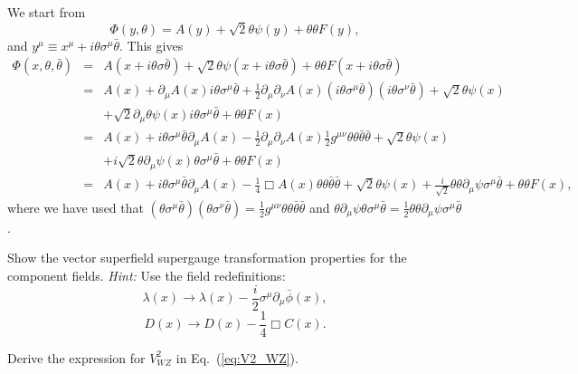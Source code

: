 \documentclass[notes.tex]{subfiles}
\begin{document}
\begin{Answer}
We start from
\begin{equation*}
\Phi(y, \theta) = A(y) + \sqrt{2}\theta\psi(y) + \theta\theta F(y),
\end{equation*}
and $y^\mu \equiv x^\mu + i\theta\sigma^\mu \bar{\theta}$. This gives
\begin{eqnarray*}
\Phi(x, \theta, \bar\theta) &=& A(x + i\theta\sigma\bar{\theta}) + \sqrt{2}\theta\psi(x + i\theta\sigma\bar{\theta}) + \theta\theta F(x + i\theta\sigma \bar{\theta}) \\
&=& A(x) + \partial_\mu A(x)i\theta\sigma^\mu \bar{\theta} + \frac{1}{2}\partial_\mu\partial_\nu A(x)(i\theta\sigma^\mu \bar{\theta})(i\theta\sigma^\nu \bar{\theta})+ \sqrt{2}\theta\psi(x) \\
&&+ \sqrt{2}\partial_\mu\theta\psi(x)i\theta\sigma^\mu \bar{\theta} + \theta\theta F(x) \\
&=& A(x) + i\theta\sigma^\mu \bar{\theta}\partial_\mu A(x) - \frac{1}{2}\partial_\mu\partial_\nu A(x)\frac{1}{2}g^{\mu\nu}\theta\theta\bar\theta\bar\theta+ \sqrt{2}\theta\psi(x) \\
&& + i\sqrt{2}\theta\partial_\mu\psi(x)\theta\sigma^\mu \bar{\theta} + \theta\theta F(x) \\
&=& A(x) + i\theta\sigma^\mu \bar{\theta}\partial_\mu A(x) - \frac{1}{4} \Box A(x)\theta\theta\bar\theta\bar\theta+ \sqrt{2}\theta\psi(x)+\frac{i}{\sqrt{2}}\theta\theta\partial_\mu \psi\sigma^\mu\bar{\theta} + \theta\theta F(x),
\end{eqnarray*}
where we have used that $(\theta\sigma^\mu \bar{\theta})(\theta\sigma^\nu \bar{\theta})=\frac{1}{2}g^{\mu\nu}\theta\theta\bar\theta\bar\theta$ and 
$\theta\partial_\mu\psi\theta\sigma^\mu \bar{\theta}=\frac{1}{2}\theta\theta\partial_\mu \psi\sigma^\mu\bar{\theta}$.
\end{Answer}

\begin{Exercise}
Show the vector superfield supergauge transformation properties for the component fields. {\it Hint:} Use the field redefinitions:
\[\lambda(x) \to \lambda(x) -\frac{i}{2}\sigma^\mu\partial_\mu\bar{\phi}(x),\]
\[D(x) \to D(x) - \frac{1}{4}\Box C(x).\]
\end{Exercise}

\begin{Exercise}
Derive the expression for $V_{WZ}^2$ in Eq.~(\ref{eq:V2_WZ}).
\end{Exercise}
\end{document}

